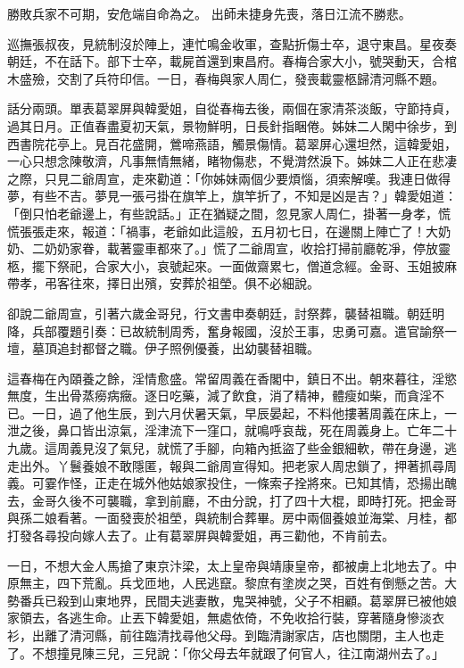 勝敗兵家不可期，安危端自命為之。
出師未捷身先喪，落日江流不勝悲。

巡撫張叔夜，見統制沒於陣上，連忙鳴金收軍，查點折傷士卒，退守東昌。星夜奏朝廷，不在話下。部下士卒，載屍首還到東昌府。春梅合家大小，號哭動天，合棺木盛殮，交割了兵符印信。一日，春梅與家人周仁，發喪載靈柩歸清河縣不題。

話分兩頭。單表葛翠屏與韓愛姐，自從春梅去後，兩個在家清茶淡飯，守節持貞，過其日月。正值春盡夏初天氣，景物鮮明，日長針指睏倦。姊妹二人閑中徐步，到西書院花亭上。見百花盛開，鶯啼燕語，觸景傷情。葛翠屏心還坦然，這韓愛姐，一心只想念陳敬濟，凡事無情無緒，睹物傷悲，不覺潸然淚下。姊妹二人正在悲凄之際，只見二爺周宣，走來勸道：「你姊妹兩個少要煩惱，須索解嘆。我連日做得夢，有些不吉。夢見一張弓掛在旗竿上，旗竿折了，不知是凶是吉？」韓愛姐道： 「倒只怕老爺邊上，有些說話。」正在猶疑之間，忽見家人周仁，掛著一身孝，慌慌張張走來，報道：「禍事，老爺如此這般，五月初七日，在邊關上陣亡了！大奶奶、二奶奶家眷，載著靈車都來了。」慌了二爺周宣，收拾打掃前廳乾凈，停放靈柩，擺下祭祀，合家大小，哀號起來。一面做齋累七，僧道念經。金哥、玉姐披麻帶孝，弔客往來，擇日出殯，安葬於祖塋。俱不必細說。

卻說二爺周宣，引著六歲金哥兒，行文書申奏朝廷，討祭葬，襲替祖職。朝廷明降，兵部覆題引奏：已故統制周秀，奮身報國，沒於王事，忠勇可嘉。遣官諭祭一壇，墓頂追封都督之職。伊子照例優養，出幼襲替祖職。

這春梅在內頤養之餘，淫情愈盛。常留周義在香閣中，鎮日不出。朝來暮往，淫慾無度，生出骨蒸癆病癥。逐日吃藥，減了飲食，消了精神，體瘦如柴，而貪淫不已。一日，過了他生辰，到六月伏暑天氣，早辰晏起，不料他摟著周義在床上，一泄之後，鼻口皆出涼氣，淫津流下一窪口，就鳴呼哀哉，死在周義身上。亡年二十九歲。這周義見沒了氣兒，就慌了手腳，向箱內抵盜了些金銀細軟，帶在身邊，逃走出外。丫鬟養娘不敢隱匿，報與二爺周宣得知。把老家人周忠鎖了，押著抓尋周義。可霎作怪，正走在城外他姑娘家投住，一條索子拴將來。已知其情，恐揚出醜去，金哥久後不可襲職，拿到前廳，不由分說，打了四十大棍，即時打死。把金哥與孫二娘看著。一面發喪於祖塋，與統制合葬畢。房中兩個養娘並海棠、月桂，都打發各尋投向嫁人去了。止有葛翠屏與韓愛姐，再三勸他，不肯前去。

一日，不想大金人馬搶了東京汴梁，太上皇帝與靖康皇帝，都被虜上北地去了。中原無主，四下荒亂。兵戈匝地，人民逃竄。黎庶有塗炭之哭，百姓有倒懸之苦。大勢番兵已殺到山東地界，民間夫逃妻散，鬼哭神號，父子不相顧。葛翠屏已被他娘家領去，各逃生命。止丟下韓愛姐，無處依倚，不免收拾行裝，穿著隨身慘淡衣衫，出離了清河縣，前往臨清找尋他父母。到臨清謝家店，店也關閉，主人也走了。不想撞見陳三兒，三兒說：「你父母去年就跟了何官人，往江南湖州去了。」

